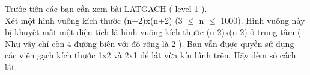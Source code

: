 Trước tiên các bạn cần xem bài LATGACH ( level 1 ).   
\\   Xét một hình vuông kích thước (n+2)x(n+2) (3 $\le$ n $\le$ 1000). Hình vuông này bị khuyết mất một diện tích là hình vuông kích thước (n-2)x(n-2) ở trung tâm ( Như vậy chỉ còn 4 đường biên với độ rộng là 2 ). Bạn vẫn được quyền sử dụng các viên gạch kích thước 1x2 và 2x1 để lát vừa kín hình trên. Hãy đếm số cách lát.  

\
